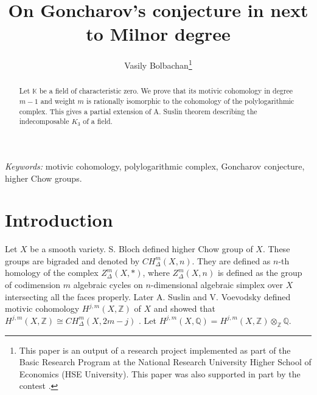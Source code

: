 \documentclass[12pt]{extarticle}
\def\mb{\mathbb}
\def\Z{\mb Z}
\def\Q{\mb Q}
\begin{document}
\title{On Goncharov's conjecture in next to Milnor degree}
\author{Vasily Bolbachan\footnote{This paper is an output of a research project implemented as part of the Basic Research Program at the National Research University Higher School of Economics (HSE University). This paper was also supported in part by the contest .}}

\maketitle



\begin{abstract}
   Let $\mathbb K$ be a field of characteristic zero. We prove that its motivic cohomology in degree $m-1$ and weight $m$ is rationally isomorphic to the cohomology of the polylogarithmic complex. This gives a partial extension of A. Suslin theorem describing the indecomposable $K_3$ of a field.
\end{abstract}

\emph{Keywords:} motivic cohomology, polylogarithmic complex, Goncharov conjecture, higher Chow groups.



\tableofcontents
\section{Introduction}
\label{sec:introduction}
Let $X$ be a smooth variety. S. Bloch  \cite{bloch1986algebraic} defined higher Chow group of $X$. These groups are bigraded and denoted by $CH^m_\Delta(X,n)$. They are defined as $n$-th homology of the complex $Z^m_\Delta(X,*)$, where $Z^m_\Delta(X,n)$ is defined as the group of codimension $m$ algebraic cycles on $n$-dimensional algebraic simplex over $X$ intersecting all the faces properly. Later A. Suslin and V. Voevodsky defined motivic cohomology $H^{j,m}(X,\Z)$ of $X$ and showed that $H^{j,m}(X,\Z)\cong CH^m_{\Delta}(X,2m-j)$ \cite{suslin2000higher, friedlander2002spectral, voevodsky2002motivic}. Let $H^{j,m}(X,\Q)=H^{j,m}(X,\Z)\otimes_\Z \Q$.
\end{document}
